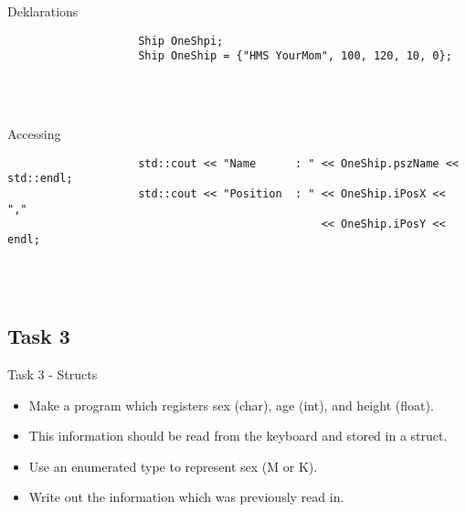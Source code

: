 \documentclass{report}
\begin{document}
			\begin{minipage}{\linewidth}
				Deklarations
				\begin{lstlisting}
					Ship OneShpi;
					Ship OneShip = {"HMS YourMom", 100, 120, 10, 0};
				\end{lstlisting}
			\end{minipage}
			\\ \\
			
			\begin{minipage}{\linewidth}
				Accessing
				\begin{lstlisting}
					std::cout << "Name		: " << OneShip.pszName << std::endl;
					std::cout << "Position	: " << OneShip.iPosX << ","
												<< OneShip.iPosY << endl;
				\end{lstlisting}
			\end{minipage}
			\\ \\
			
			
			\subsection{Task 3}
				Task 3 - Structs \\
				
				\begin{itemize}
					\item Make a program which registers sex (char), age (int), and height (float).
					\item This information should be read from the keyboard and stored in a struct.
					\item Use an enumerated type to represent sex (M or K).
					\item Write out the information which was previously read in.
				\end{itemize}
				
\end{document}
